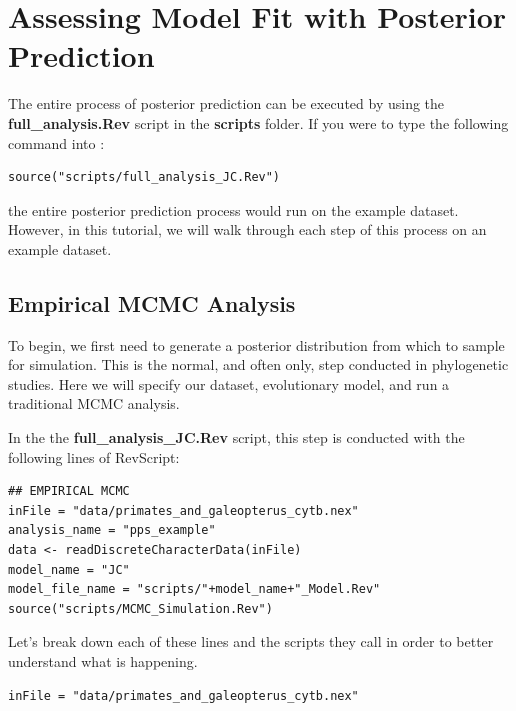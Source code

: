 \bigskip
\section{Assessing Model Fit with Posterior Prediction}

The entire process of posterior prediction can be executed by using the \textbf{full\_analysis.Rev} script in the \textbf{scripts}
folder. If you were to type the following command into \RevBayes:

{\tt \begin{snugshade*}
\begin{lstlisting}
source("scripts/full_analysis_JC.Rev")
\end{lstlisting}
\end{snugshade*}}

the entire posterior prediction process would run on the example dataset. However, in this tutorial, we 
will walk through each step of this process on an example dataset. 

\subsection{Empirical MCMC Analysis}

To begin, we first need to generate a posterior distribution from which to sample for simulation. 
This is the normal, and often only, step conducted in phylogenetic studies. Here we will specify our 
dataset, evolutionary model, and run a traditional MCMC analysis. 

In the the \textbf{full\_analysis\_JC.Rev} script, this step is conducted with the following lines of RevScript:

{\tt \begin{snugshade*}
\begin{lstlisting}
## EMPIRICAL MCMC
inFile = "data/primates_and_galeopterus_cytb.nex"
analysis_name = "pps_example"
data <- readDiscreteCharacterData(inFile)
model_name = "JC"
model_file_name = "scripts/"+model_name+"_Model.Rev"
source("scripts/MCMC_Simulation.Rev")
\end{lstlisting}
\end{snugshade*}}

Let's break down each of these lines and the scripts they call in order to better understand what is 
happening. 

{\tt \begin{snugshade*}
\begin{lstlisting}
inFile = "data/primates_and_galeopterus_cytb.nex"
\end{lstlisting}
\end{snugshade*}}

